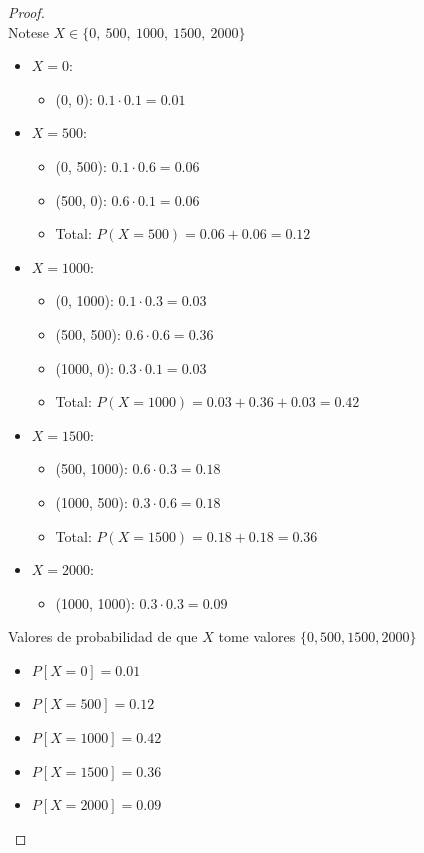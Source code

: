 \documentclass[11pt,letterpaper]{article}
\begin{document}
\begin{proof}\,\\
    
Notese $X \in \{0,\ 500,\ 1000,\ 1500,\ 2000\}$

\begin{itemize}
    \item \( X = 0 \):  
    \begin{itemize}
        \item (0, 0): \( 0.1 \cdot 0.1 = 0.01 \)
    \end{itemize}

    \item \( X = 500 \):  
    \begin{itemize}
        \item (0, 500): \( 0.1 \cdot 0.6 = 0.06 \)
        \item (500, 0): \( 0.6 \cdot 0.1 = 0.06 \)
        \item Total: \( P(X = 500) = 0.06 + 0.06 = 0.12 \)
    \end{itemize}

    \item \( X = 1000 \):  
    \begin{itemize}
        \item (0, 1000): \( 0.1 \cdot 0.3 = 0.03 \)
        \item (500, 500): \( 0.6 \cdot 0.6 = 0.36 \)
        \item (1000, 0): \( 0.3 \cdot 0.1 = 0.03 \)
        \item Total: \( P(X = 1000) = 0.03 + 0.36 + 0.03 = 0.42 \)
    \end{itemize}

    \item \( X = 1500 \):  
    \begin{itemize}
        \item (500, 1000): \( 0.6 \cdot 0.3 = 0.18 \)
        \item (1000, 500): \( 0.3 \cdot 0.6 = 0.18 \)
        \item Total: \( P(X = 1500) = 0.18 + 0.18 = 0.36 \)
    \end{itemize}

    \item \( X = 2000 \):  
    \begin{itemize}
        \item (1000, 1000): \( 0.3 \cdot 0.3 = 0.09 \)
    \end{itemize}
\end{itemize}


Valores de probabilidad de que \( X \) tome valores $\{0,500,1500,2000\}$\,\\
\begin{itemize}
    \item $P[X=0] =0.01$
    \item $P[X=500]= 0.12$
    \item $P[X=1000] = 0.42$
    \item $P[X=1500] = 0.36$
    \item $P[X=2000] = 0.09$ 
\end{itemize}

\end{proof}\,\\
\end{document}
